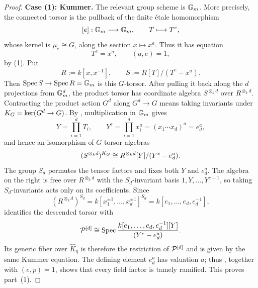 \begin{proof}
\medskip
\noindent\textbf{Case (1): Kummer.}
The relevant group scheme is $\mathbb{G}_m$. More precisely, the connected torsor is
the pullback of the finite \'etale homomorphism
\[
    [e]:\mathbb{G}_m\longrightarrow\mathbb{G}_m,\qquad T\longmapsto T^e,
\]
whose kernel is $\mu_e\cong G$, along the section $x\mapsto x^a$. Thus it has
equation
\[
    T^e=x^a,\qquad (a,e)=1,
\]
by (1). Put
\[
    R:=k[x,x^{-1}],\qquad S:=R[T]/(T^e-x^a).
\]
Then $\operatorname{Spec} S\to\operatorname{Spec} R=\mathbb{G}_m$ is this $G$-torsor. After pulling it back
along the $d$ projections from $\mathbb{G}_m^d$, the product torsor has coordinate
algebra $S^{\otimes_k d}$ over $R^{\otimes_k d}$. Contracting the product
action $G^d$ along $G^d\to G$ means taking invariants under
$K_{G}=\ker(G^d\to G)$. By
, multiplication in $\mathbb{G}_m$ gives
\[
    Y=\prod_{i=1}^dT_i,\qquad
    Y^e=\prod_{i=1}^dx_i^a=(x_1\cdots x_d)^a=e_d^a,
\]
and hence an isomorphism of $G$-torsor algebras
\[
    (S^{\otimes_k d})^{K_{G}}
       \cong
    R^{\otimes_k d}[Y]/(Y^e-e_d^a).
\]
The group $S_d$ permutes the tensor factors and fixes both $Y$ and $e_d^a$.
The algebra on the right is free over $R^{\otimes_k d}$ with the
$S_d$-invariant basis $1,Y,\dots,Y^{e-1}$, so taking $S_d$-invariants acts
only on its coefficients. Since
\[
    (R^{\otimes_k d})^{S_d}
       =k[x_1^{\pm1},\dots,x_d^{\pm1}]^{S_d}
       =k[e_1,\dots,e_d,e_d^{-1}],
\]
 identifies the descended torsor with
\[
    \mathcal{P}^{[d]}\cong
    \operatorname{Spec}\frac{k[e_1,\dots,e_d,e_d^{-1}][Y]}{(Y^e-e_d^a)}.
\]
Its generic fiber over $\widehat K_\eta$ is therefore the restriction of
$\mathcal{P}^{[d]}$ and is given by the same Kummer equation. The defining element
$e_d^a$ has valuation $a$; thus
, together with $(e,p)=1$, shows that every
field factor is tamely ramified. This proves part~(1).


\end{proof}
